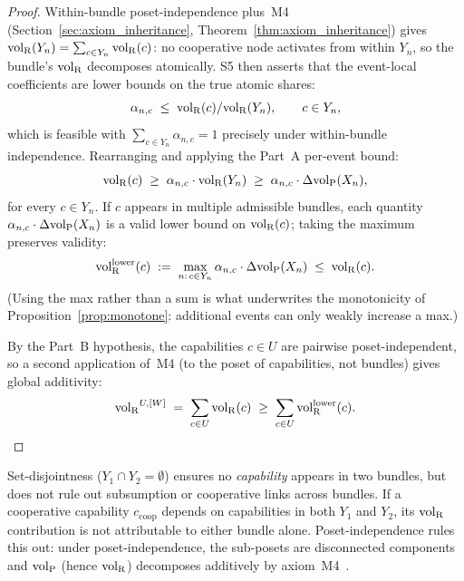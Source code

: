\begin{proof}
Within-bundle poset-independence plus~M4
(Section~\ref{sec:axiom_inheritance},
Theorem~\ref{thm:axiom_inheritance}) gives
${\operatorname{vol}_{\mathrm{R}}}(Y_n) = \sum_{c \in Y_n} {\operatorname{vol}_{\mathrm{R}}}(c)$: no cooperative node
activates from within $Y_n$, so the bundle's ${\operatorname{vol}_{\mathrm{R}}}$ decomposes
atomically.  S5 then asserts that the event-local coefficients
are lower bounds on the true atomic shares:
\[
  \alpha_{n,c} \;\leq\; {\operatorname{vol}_{\mathrm{R}}}(c) / {\operatorname{vol}_{\mathrm{R}}}(Y_n),
  \qquad c \in Y_n,
\]
which is feasible with $\sum_{c \in Y_n} \alpha_{n,c} = 1$
precisely under within-bundle independence.  Rearranging and
applying the Part~A per-event bound:
\[
  {\operatorname{vol}_{\mathrm{R}}}(c) \;\geq\; \alpha_{n,c} \cdot {\operatorname{vol}_{\mathrm{R}}}(Y_n)
  \;\geq\; \alpha_{n,c} \cdot \Delta{\operatorname{vol}_{\mathrm{P}}}(X_n),
\]
for every $c \in Y_n$.  If $c$ appears in multiple admissible
bundles, each quantity $\alpha_{n,c} \cdot \Delta{\operatorname{vol}_{\mathrm{P}}}(X_n)$ is a
valid lower bound on ${\operatorname{vol}_{\mathrm{R}}}(c)$; taking the maximum preserves
validity:
\[
  {\operatorname{vol}_{\mathrm{R}}^{\mathrm{lower}}}(c) \;:=\;
  \max_{n:\, c \in Y_n} \alpha_{n,c} \cdot \Delta{\operatorname{vol}_{\mathrm{P}}}(X_n)
  \;\leq\; {\operatorname{vol}_{\mathrm{R}}}(c).
\]
(Using the max rather than a sum is what underwrites the
monotonicity of Proposition~\ref{prop:monotone}: additional
events can only weakly increase a max.)

By the Part~B hypothesis, the capabilities $c \in U$ are
pairwise poset-independent, so a second application of~M4
(to the poset of capabilities, not bundles) gives global
additivity:
\[
  {\operatorname{vol}_{\mathrm{R}}}^{U,[W]} \;=\; \sum_{c \in U} {\operatorname{vol}_{\mathrm{R}}}(c)
  \;\geq\; \sum_{c \in U} {\operatorname{vol}_{\mathrm{R}}^{\mathrm{lower}}}(c).
\]
\end{proof}

\begin{remark}
\label{rem:poset_indep}
Set-disjointness ($Y_1 \cap Y_2 = \emptyset$) ensures no
\emph{capability} appears in two bundles, but does not rule out
subsumption or cooperative links across bundles.  If a cooperative
capability $c_{\mathrm{coop}}$ depends on capabilities in both
$Y_1$ and $Y_2$, its ${\operatorname{vol}_{\mathrm{R}}}$ contribution is not attributable to
either bundle alone.  Poset-independence rules this out: under
poset-independence, the sub-posets are disconnected components
and ${\operatorname{vol}_{\mathrm{P}}}$ (hence ${\operatorname{vol}_{\mathrm{R}}}$) decomposes additively by
axiom~M4~\citep[Proposition~1]{lasser2026poset}.
\end{remark}


